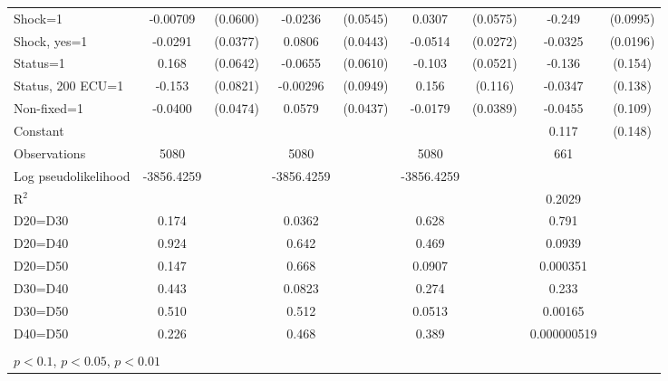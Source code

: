 \begin{tabular}{l|cccccc|cc}
Shock=1         & -0.00709         & (0.0600)&  -0.0236         & (0.0545)&   0.0307         & (0.0575)&   -0.249\sym{**} & (0.0995)\\
Shock, yes=1    &  -0.0291         & (0.0377)&   0.0806\sym{*}  & (0.0443)&  -0.0514\sym{*}  & (0.0272)&  -0.0325         & (0.0196)\\
Status=1        &    0.168\sym{***}& (0.0642)&  -0.0655         & (0.0610)&   -0.103\sym{**} & (0.0521)&   -0.136         &  (0.154)\\
Status, 200 ECU=1&   -0.153\sym{*}  & (0.0821)& -0.00296         & (0.0949)&    0.156         &  (0.116)&  -0.0347         &  (0.138)\\
Non-fixed=1     &  -0.0400         & (0.0474)&   0.0579         & (0.0437)&  -0.0179         & (0.0389)&  -0.0455         &  (0.109)\\
Constant        &                  &         &                  &         &                  &         &    0.117         &  (0.148)\\
\hline
Observations    &     5080         &         &     5080         &         &     5080         &         &      661         &         \\
Log pseudolikelihood  & -3856.4259   &         &     -3856.4259             &         &       -3856.4259           &         &           &   \\ 
R$^2$      &                  &         &                  &         &                  &         &       0.2029    &   \\ 

D20=D30         &    0.174         &         &   0.0362         &         &    0.628         &         &    0.791         &         \\
D20=D40         &    0.924         &         &    0.642         &         &    0.469         &         &   0.0939         &         \\
D20=D50         &    0.147         &         &    0.668         &         &   0.0907         &         & 0.000351         &         \\
D30=D40         &    0.443         &         &   0.0823         &         &    0.274         &         &    0.233         &         \\
D30=D50         &    0.510         &         &    0.512         &         &   0.0513         &         &  0.00165         &         \\
D40=D50         &    0.226         &         &    0.468         &         &    0.389         &         &0.000000519         &         \\
\hline\hline
\multicolumn{9}{p{16cm}}{\tiny }\\
\multicolumn{9}{l}{\tiny \sym{*} \(p<0.1\), \sym{**} \(p<0.05\), \sym{***} \(p<0.01\)}\\
\end{tabular}